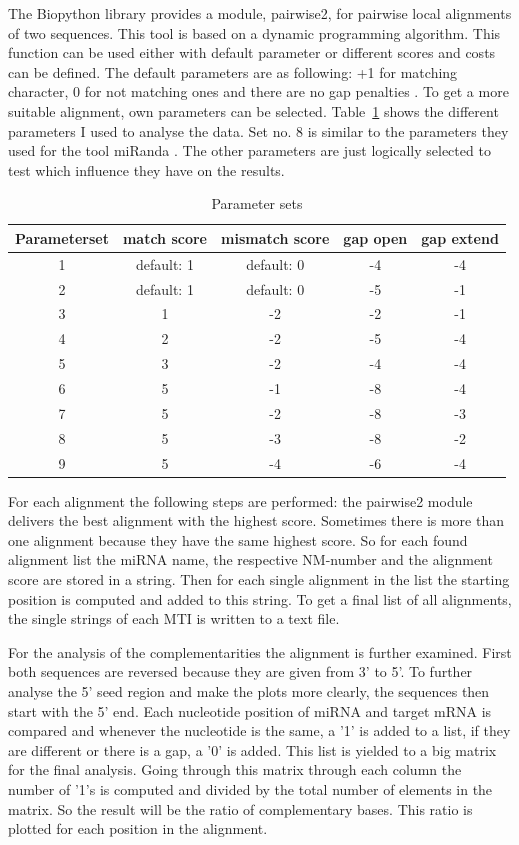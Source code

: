\documentclass[12pt]{article}
\begin{document}
The Biopython library provides a module, pairwise2, for pairwise local alignments of two sequences. This tool is based on a dynamic programming algorithm. This function can be used either with default parameter or different scores and costs can be defined. The default parameters are as following: +1 for matching character, 0 for not matching ones and there are no gap penalties \cite{pairwise}. To get a more suitable alignment, own parameters can be selected. Table~\ref{table:parameter} shows the different parameters I used to analyse the data. Set no. 8 is similar to the parameters they used for the tool miRanda \cite{Enright}. The other parameters are just logically selected to test which influence they have on the results.


\begin{table}
\caption{Parameter sets}
\vspace{0.3cm}
\begin{tabular}{c|c|c|c|c}
Parameterset & match score & mismatch score & gap open & gap extend\\
\hline\hline 
1 & default: 1 & default: 0 & -4 & -4\\
2 &  default: 1 & default: 0 & -5 & -1 \\
3 &  1 & -2 & -2 & -1 \\
4 &  2 & -2 & -5 & -4 \\
5 &  3 & -2 & -4 & -4 \\
6 &  5 & -1 & -8 & -4 \\
7 &  5 & -2 & -8 & -3 \\
8 &  5 & -3 & -8 & -2 \\
9 &  5 & -4 & -6 & -4 \\
\hline
\end{tabular}
\label{table:parameter}
\end{table}

For each alignment the following steps are performed: the pairwise2 module delivers the best alignment with the highest score. Sometimes there is more than one alignment because they have the same highest score. So for each found alignment list the miRNA name, the respective NM-number and the alignment score are stored in a string. Then for each single alignment in the list the starting position is computed and added to this string. To get a final list of all alignments, the single strings of each MTI is written to a text file.

For the analysis of the complementarities the alignment is further examined. First both sequences are reversed because they are given from 3' to 5'. To further analyse the 5' seed region and make the plots more clearly, the sequences then start with the 5' end. 
Each nucleotide position of miRNA and target mRNA is compared and whenever the nucleotide is the same, a '1' is added to a list, if they are different or there is a gap, a '0' is added. This list is yielded to a big matrix for the final analysis. Going through this matrix through each column the number of '1's is computed and divided by the total number of elements in the matrix. So the result will be the ratio of complementary bases. This ratio is plotted for each position in the alignment. 
\end{document}
